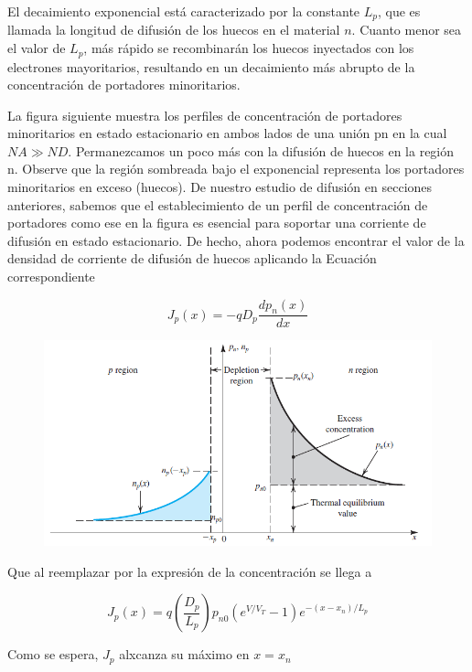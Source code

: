 El decaimiento exponencial está caracterizado por la constante \(L_p\), que es llamada la longitud de difusión de los huecos en el material $n$. Cuanto menor sea el valor de \(L_p\), más rápido se recombinarán los huecos inyectados con los electrones mayoritarios, resultando en un decaimiento más abrupto de la concentración de portadores minoritarios.

La figura siguiente muestra los perfiles de concentración de portadores minoritarios en estado estacionario en ambos lados de una unión pn en la cual \(NA \gg ND\). Permanezcamos un poco más con la difusión de huecos en la región n. Observe que la región sombreada bajo el exponencial representa los portadores minoritarios en exceso (huecos). De nuestro estudio de difusión en secciones anteriores, sabemos que el establecimiento de un perfil de concentración de portadores como ese en la figura es esencial para soportar una corriente de difusión en estado estacionario. De hecho, ahora podemos encontrar el valor de la densidad de corriente de difusión de huecos aplicando la Ecuación correspondiente

\begin{equation*}
J_p (x) = -q D_p \frac{d p_n (x)}{dx}
\end{equation*}

\begin{figure}[H]
    \centering
    \includegraphics[scale=0.6]{Electronica/pn_f5.png}
\end{figure}

Que al reemplazar por la expresión de la concentración se llega a  

\begin{equation*}
J_p (x) = q \left( \frac{D_p}{L_p} \right) p_{n0} \left( e^{V/V_T} - 1 \right) e^{-(x-x_n)/L_p}
\end{equation*}

Como se espera, $J_p$ alxcanza su máximo en $x=x_n$

